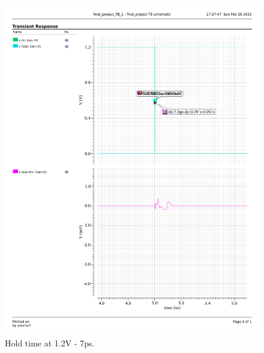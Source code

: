 \documentclass[a4paper,12pt]{article}
\begin{document}
\begin{figure}[H]
\begin{minipage}{0.49\textwidth}
        \includegraphics[width=\textwidth]{graphs/hold_1.2_7p.pdf}
        \caption{Hold time at 1.2V - 7ps.}
    \end{minipage}
\end{figure}
\end{document}
